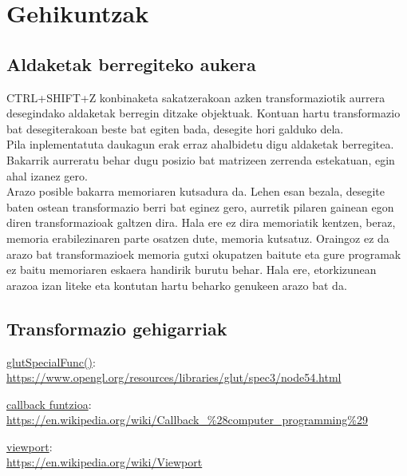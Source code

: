 \documentclass[12pt]{article}
\begin{document}
\section{Gehikuntzak}

\subsection{Aldaketak berregiteko aukera}

CTRL+SHIFT+Z konbinaketa sakatzerakoan azken transformaziotik aurrera desegindako aldaketak berregin ditzake objektuak. Kontuan hartu transformazio bat desegiterakoan beste bat egiten bada, desegite hori galduko dela.\\
Pila inplementatuta daukagun erak erraz ahalbidetu digu aldaketak berregitea. Bakarrik aurreratu behar dugu posizio bat matrizeen zerrenda estekatuan, egin ahal izanez gero.\\

Arazo posible bakarra memoriaren kutsadura da. Lehen esan bezala, desegite baten ostean transformazio berri bat eginez gero, aurretik pilaren gainean egon diren transformazioak galtzen dira. Hala ere ez dira memoriatik kentzen, beraz, memoria erabilezinaren parte osatzen dute, memoria kutsatuz. Oraingoz ez da arazo bat transformazioek memoria gutxi okupatzen baitute eta gure programak ez baitu memoriaren eskaera handirik burutu behar. Hala ere, etorkizunean arazoa izan liteke eta kontutan hartu beharko genukeen arazo bat da.


\subsection{Transformazio gehigarriak}

\pagebreak




\begin{thebibliography}{9}

\underline{glutSpecialFunc()}:\\
\url{https://www.opengl.org/resources/libraries/glut/spec3/node54.html}

\underline{callback funtzioa}:\\
\url{https://en.wikipedia.org/wiki/Callback_%28computer_programming%29}

\underline{viewport}:\\
\url{https://en.wikipedia.org/wiki/Viewport}

\end{thebibliography}
\end{document}
